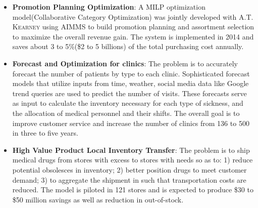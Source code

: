 \documentclass[12pt,a4paper,roman]{moderncv} %
\begin{document}
{} 
{

\begin{itemize}
\item \textbf{Promotion Planning Optimization}: A MILP optimization model(Collaborative Category Optimization) was
jointly developed with \textsc{A.T. Kearney} using AIMMS to build promotion planning and
assortment selection to maximize the overall revenue gain.
The system is implemented in 2014 and saves about 3 to 5\%(\$2 to 5 billions) of the total purchasing cost annually.
\item \textbf{Forecast and Optimization for clinics}: The problem is
to accurately forecast the number of patients by type to each clinic.
Sophisticated forecast models that utilize inputs from time, weather, social
media data like Google trend queries are used to predict the number of
visits. These forecasts serve as input to calculate the inventory necessary for
each type of sickness, and the allocation of medical personnel and their
shifts. The overall goal is to improve customer service and increase the number
of clinics from 136 to 500 in three to five years.
\item \textbf{High Value Product Local Inventory Transfer}:  The problem is to ship 
medical drugs from stores with excess to stores with needs so as to: 1) reduce
potential obsolesces in inventory; 2) better position drugs to meet customer
demand; 3) to aggregate the shipment in such that transportation costs are
reduced. The model is piloted in 121 stores and is expected
to produce \$30 to \$50 million savings as well as reduction in
out-of-stock.
\end{itemize} }
 
\end{document}
